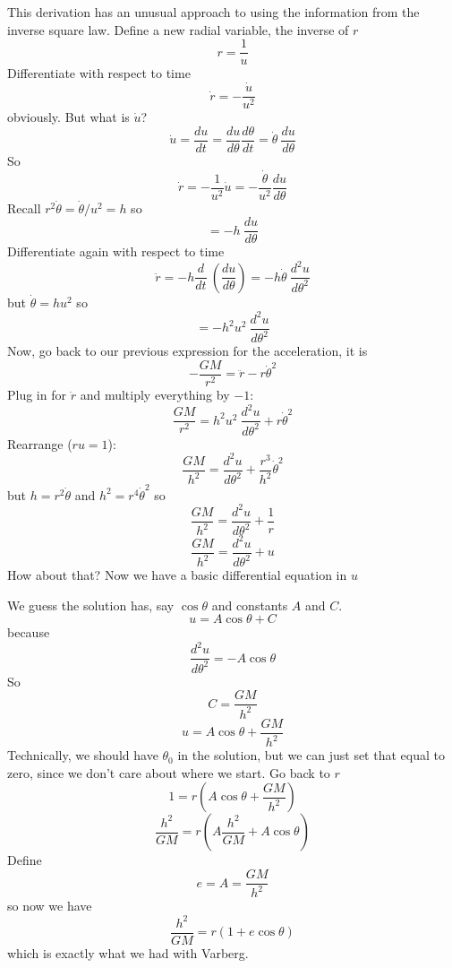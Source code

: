\documentclass[11pt, oneside]{article}
\begin{document}
This derivation has an unusual approach to using the information from the inverse square law.  Define a new radial variable, the inverse of $r$
\[ r= \frac{1}{u} \]
Differentiate with respect to time
\[ \dot{r} = - \frac{\dot{u}}{u^2} \]
obviously.  But what is $\dot{u}$?
\[ \dot{u}= \frac{du}{dt} =  \frac{du}{d\theta} \frac{d\theta}{dt} =  \dot{\theta} \ \frac{du}{d\theta} \]
So
\[ \dot{r}= -\frac{1}{u^2} \dot{u} =  -\frac{\dot{\theta}}{u^2} \frac{du}{d\theta} \]
Recall $r^2 \dot{\theta} = \dot{\theta}/u^2 = h$ so
\[ = -h \ \frac{du}{d \theta}\]
Differentiate again with respect to time
\[ \ddot{r} = -h \frac{d}{dt} \ (\frac{du}{d \theta}) = -h \dot{\theta} \ \frac{d^2 u}{d\theta^2} \]
but $\dot{\theta} = hu^2$ so
\[ = - h^2 u^2 \  \frac{d^2 u}{d\theta^2} \]
Now, go back to our previous expression for the acceleration, it is
\[  - \frac{GM}{r^2}  =  \ddot{r} - r \dot{\theta}^2 \]
Plug in for $\ddot{r}$ and multiply everything by $-1$:
\[ \frac{GM}{r^2}  = h^2 u^2 \  \frac{d^2 u}{d\theta^2} + r \dot{\theta}^2 \]
Rearrange ($ru=1$):
\[ \frac{GM}{h^2}  =  \frac{d^2 u}{d\theta^2} + \frac{r^3}{h^2} \dot{\theta}^2 \]
but $h = r^2 \dot{\theta}$ and $h^2 = r^4 \dot{\theta}^2$ so
\[ \frac{GM}{h^2}  =  \frac{d^2 u}{d\theta^2} + \frac{1}{r}  \]
\[ \frac{GM}{h^2}  =  \frac{d^2 u}{d\theta^2} + u \]
How about that?  Now we have a basic differential equation in $u$

We guess the solution has, say $\cos \theta$ and constants $A$ and $C$.
\[ u = A \cos \theta + C \]
because
\[ \frac{d^2 u}{d\theta^2} = -A \cos \theta  \]
So
\[ C = \frac{GM}{h^2} \]
\[ u = A \cos \theta + \frac{GM}{h^2} \]
Technically, we should have $\theta_0$ in the solution, but we can just set that equal to zero, since we don't care about where we start.  Go back to $r$
\[ 1 = r(A \cos \theta + \frac{GM}{h^2}) \]
\[  \frac{h^2}{GM} = r(A \frac{h^2}{GM} + A \cos \theta) \]
Define 
\[ e = A = \frac{GM}{h^2} \]
so now we have
\[ \frac{h^2}{GM} = r(1 + e \cos \theta) \]
which is exactly what we had with Varberg.
\end{document}
